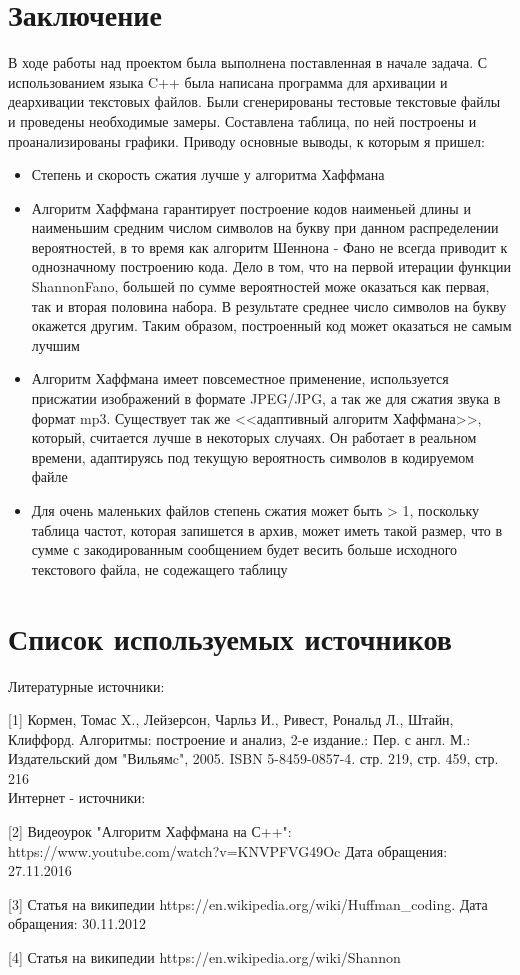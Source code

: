 \documentclass[russian, a4paper, 12pt]{article}
\begin{document}
\section{Заключение}
В ходе работы над проектом была выполнена поставленная в начале задача. С использованием
языка C++ была написана программа для архивации и деархивации текстовых файлов. Были сгенерированы
тестовые текстовые файлы и проведены необходимые замеры. Составлена таблица, по ней построены
и проанализированы графики. Приводу основные выводы, к которым я пришел:
\begin{itemize}
  \item Степень и скорость сжатия лучше у алгоритма Хаффмана
  \item Алгоритм Хаффмана гарантирует построение кодов наименьей длины и наименьшим средним числом символов
  на букву при данном распределении вероятностей, в то время как алгоритм
  Шеннона - Фано не всегда приводит к однозначному построению кода.
  Дело в том, что на первой итерации функции ShannonFano, большей по сумме вероятностей
  може оказаться как первая, так и вторая половина набора. В результате среднее число
  символов на букву окажется другим. Таким образом, построенный код может оказаться не самым лучшим
  \item Алгоритм Хаффмана имеет повсеместное применение, используется присжатии изображений в формате JPEG/JPG,
  а так же для сжатия звука в формат mp3. Существует так же <<адаптивный алгоритм Хаффмана>>, который,
  считается лучше в некоторых случаях. Он работает в реальном времени, адаптируясь под текущую
  вероятность символов в кодируемом файле
  \item Для очень маленьких файлов степень сжатия может быть > 1, поскольку таблица частот,
  которая запишется в архив, может иметь такой размер, что в сумме с закодированным сообщением будет
  весить больше исходного текстового файла, не содежащего таблицу
\end{itemize}
\newpage
\section{Список используемых источников}
Литературные источники:

[1]  Кормен, Томас X., Лейзерсон, Чарльз И., Ривест, Рональд Л., Штайн, Клиффорд. Алгоритмы: построение
и анализ, 2-е издание.: Пер. с англ. М.: Издательский дом "Вильямc", 2005. ISBN 5-8459-0857-4. стр. 219,
стр. 459, стр. 216\\


Интернет - источники:

[2] Видеоурок "Алгоритм Хаффмана на С++":\\
https://www.youtube.com/watch?v=KNVPFVG49Oc Дата обращения: 27.11.2016

[3] Статья на википедии https://en.wikipedia.org/wiki/Huffman\_coding. Дата обращения: 30.11.2012

[4] Статья на википедии https://en.wikipedia.org/wiki/Shannon%
\end{document}
